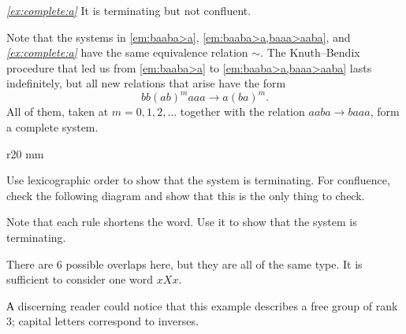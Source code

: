 \textit{\ref{ex:complete:a}} It is terminating but not confluent.

 Note that the systems in \ref{em:baaba>a}, \ref{em:baaba>a,baaa>aaba}, and \textit{\ref{ex:complete:a}} have the same equivalence relation $\sim$.
The Knuth--Bendix procedure that led us from \ref{em:baaba>a} to \ref{em:baaba>a,baaa>aaba} lasts indefinitely, but all new relations that arise have the form
\[bb(ab)^{m}aaa\to a(ba)^m.\]
All of them, taken at $m=0,1,2,\dots$ together with the relation $aaba\to baaa$, form a complete system.

\begin{wrapfigure}{r}{20 mm}
\vskip-2mm
\centering
{}
\end{wrapfigure}

\parit{\ref{ex:complete:b}}
Use lexicographic order to show that the system is terminating.
For confluence, check the following diagram and show that this is the only thing to check.


\parit{\ref{ex:complete:c}}
Note that each rule shortens the word.
Use it to show that the system is terminating.

There are 6 possible overlaps here, but they are all of the same type.
It is sufficient to consider one word $xXx$.

А discerning reader could notice that this example describes a free group of rank 3;
capital letters correspond to inverses. 

\spell{\end{multicols}}{}
\newpage
